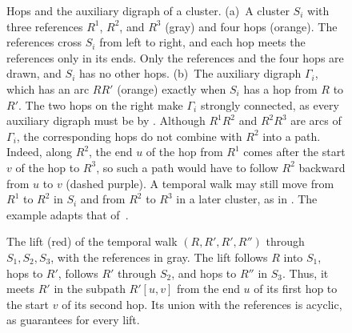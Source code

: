 \documentclass[fontsize=12pt,leading=14pt]{fullpaper}
\begin{document}
\begin{figure}[ht]
  \caption{Hops and the auxiliary digraph of a cluster.
    (a)~A cluster $S_i$ with three references $R^1$, $R^2$, and $R^3$ (gray) and four hops (orange).
    The references cross $S_i$ from left to right, and each hop meets the references only in its ends.
    Only the references and the four hops are drawn, and $S_i$ has no other hops.
    (b)~The auxiliary digraph $\Gamma_i$, which has an arc $RR'$ (orange) exactly when $S_i$ has a hop from $R$ to $R'$.
    The two hops on the right make $\Gamma_i$ strongly connected, as every auxiliary digraph must be by .
    Although $R^1R^2$ and $R^2R^3$ are arcs of $\Gamma_i$, the corresponding hops do not combine with $R^2$ into a path.
    Indeed, along $R^2$, the end $u$ of the hop from $R^1$ comes after the start $v$ of the hop to $R^3$, so such a path would have to follow $R^2$ backward from $u$ to $v$ (dashed purple).
    A temporal walk may still move from $R^1$ to $R^2$ in $S_i$ and from $R^2$ to $R^3$ in a later cluster, as in .
  The example adapts that of~\cite[Figure~3]{HKMM26a}.}
  \label{fig:s3-hops}
\end{figure}

\begin{figure}[ht]
  \centering
  \caption{The lift (red) of the temporal walk $(R,R',R',R'')$ through $S_1,S_2,S_3$, with the references in gray.
    The lift follows $R$ into $S_1$, hops to $R'$, follows $R'$ through $S_2$, and hops to $R''$ in $S_3$.
    Thus, it meets $R'$ in the subpath $R'[u,v]$ from the end $u$ of its first hop to the start $v$ of its second hop.
  Its union with the references is acyclic, as  guarantees for every lift.}
  \label{fig:s3-temporal}
\end{figure}
\end{document}
